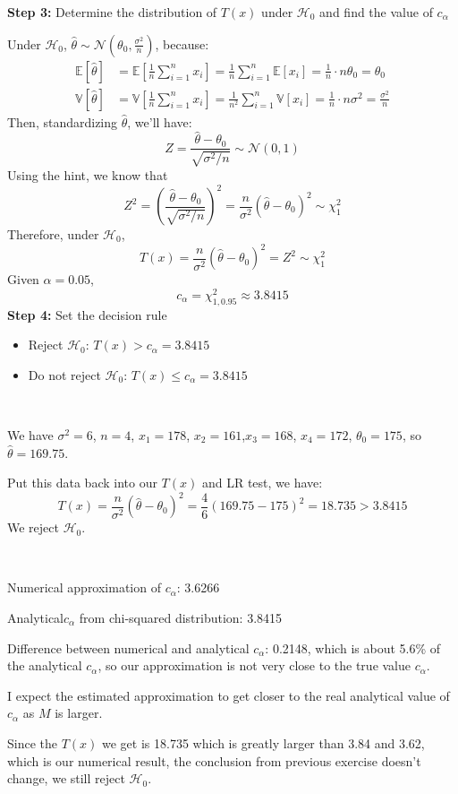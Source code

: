 \begin{solution}
    \textbf{Step 3:} Determine the distribution of $T(x)$ under $\mathcal{H}_0$ and find the value of $c_\alpha$

    Under $\mathcal{H}_0$, $\hat{\theta} \sim \mathcal{N}(\theta_0, \frac{\sigma^2}{n})$, because:
    \begin{align*}
        \mathbb{E}[\hat{\theta}] &= \mathbb{E}\left[\frac{1}{n}\sum\limits_{i=1}^{n}x_i\right] = \frac{1}{n}\sum\limits_{i=1}^{n}\mathbb{E}[x_i] = \frac{1}{n}\cdot n\theta_0 = \theta_0 \\
        \mathbb{V}[\hat{\theta}] &= \mathbb{V}\left[ \frac{1}{n}\sum\limits_{i=1}^{n}x_i\right] = \frac{1}{n^2} \sum\limits_{i=1}^{n}\mathbb{V}[x_i] = \frac{1}{n}\cdot n\sigma^2 = \frac{\sigma^2}{n}
    \end{align*}
    Then, standardizing $\hat{\theta}$, we'll have:
    \[
    Z = \frac{\hat{\theta} - \theta_0}{\sqrt{\sigma^2/n}} \sim \mathcal{N}(0, 1)
    \]
    Using the hint, we know that
    \[
    Z^2 = \left(\frac{\hat{\theta} - \theta_0}{\sqrt{\sigma^2/n}}\right)^2 = \frac{n}{\sigma^2}(\hat{\theta} - \theta_0)^2 \sim \chi_{1}^{2}
    \]
    Therefore, under $\mathcal{H}_0$,
    \[
    T(x) = \frac{n}{\sigma^2}(\hat{\theta} - \theta_0)^2 = Z^2 \sim \chi_{1}^2
    \]
    Given $\alpha=0.05$, 
    \[
    c_\alpha = \chi_{1, 0.95}^{2} \approx 3.8415
    \]
    \textbf{Step 4:} Set the decision rule
    \begin{itemize}
        \item Reject $\mathcal{H}_0$: $T(x) > c_\alpha = 3.8415$
        \item Do not reject  $\mathcal{H}_0$: $T(x) \leq c_\alpha = 3.8415$
    \end{itemize}
\end{solution}

\begin{solution}
    \ 

    We have $\sigma^2=6$, $n=4$, $x_1=178$, $x_2=161$,$x_3=168$, $x_4=172$, $\theta_0=175$, so $\hat{\theta}=169.75$.

    Put this data back into our $T(x)$ and LR test, we have:
    \[
    T(x) = \frac{n}{\sigma^2}(\hat{\theta}-\theta_0)^2 = \frac{4}{6}(169.75-175)^2 = 18.735 > 3.8415
    \]
    We reject $\mathcal{H}_0$.
\end{solution}

\begin{solution}
    \

Numerical approximation of $c_\alpha$: 3.6266

Analytical$ c_\alpha$ from chi-squared distribution: 3.8415

Difference between numerical and analytical $c_\alpha$: 0.2148, which is about 5.6\% of the analytical $c_\alpha$, so our approximation is not very close to the true value $c_\alpha$.

I expect the estimated approximation to get closer to the real analytical value of $c_\alpha$ as $M$ is larger.

Since the $T(x)$ we get is 18.735 which is greatly larger than 3.84 and 3.62, which is our numerical result, the conclusion from previous exercise doesn't change, we still reject $\mathcal{H}_{0}$.
\end{solution}


